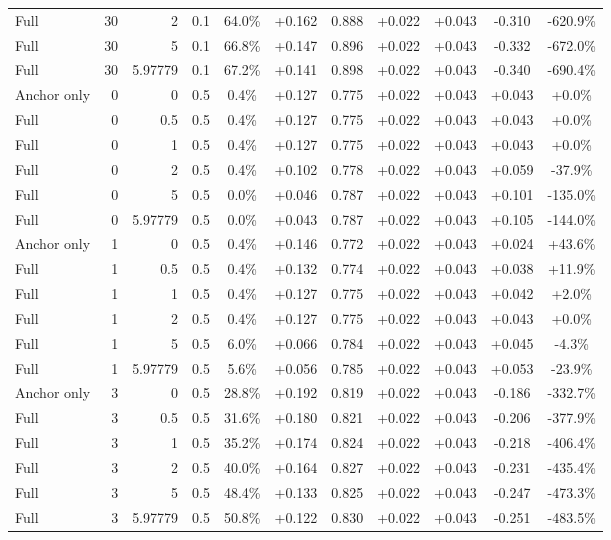 \begin{table}[htbp]
\begin{tabular}{lrrrccccccc}
Full & 30 & 2 & 0.1 & 64.0\% & +0.162 & 0.888 & +0.022 & +0.043 & -0.310 & -620.9\% \\
Full & 30 & 5 & 0.1 & 66.8\% & +0.147 & 0.896 & +0.022 & +0.043 & -0.332 & -672.0\% \\
Full & 30 & 5.97779 & 0.1 & 67.2\% & +0.141 & 0.898 & +0.022 & +0.043 & -0.340 & -690.4\% \\
Anchor only & 0 & 0 & 0.5 & 0.4\% & +0.127 & 0.775 & +0.022 & +0.043 & +0.043 & +0.0\% \\
Full & 0 & 0.5 & 0.5 & 0.4\% & +0.127 & 0.775 & +0.022 & +0.043 & +0.043 & +0.0\% \\
Full & 0 & 1 & 0.5 & 0.4\% & +0.127 & 0.775 & +0.022 & +0.043 & +0.043 & +0.0\% \\
Full & 0 & 2 & 0.5 & 0.4\% & +0.102 & 0.778 & +0.022 & +0.043 & +0.059 & -37.9\% \\
Full & 0 & 5 & 0.5 & 0.0\% & +0.046 & 0.787 & +0.022 & +0.043 & +0.101 & -135.0\% \\
Full & 0 & 5.97779 & 0.5 & 0.0\% & +0.043 & 0.787 & +0.022 & +0.043 & +0.105 & -144.0\% \\
Anchor only & 1 & 0 & 0.5 & 0.4\% & +0.146 & 0.772 & +0.022 & +0.043 & +0.024 & +43.6\% \\
Full & 1 & 0.5 & 0.5 & 0.4\% & +0.132 & 0.774 & +0.022 & +0.043 & +0.038 & +11.9\% \\
Full & 1 & 1 & 0.5 & 0.4\% & +0.127 & 0.775 & +0.022 & +0.043 & +0.042 & +2.0\% \\
Full & 1 & 2 & 0.5 & 0.4\% & +0.127 & 0.775 & +0.022 & +0.043 & +0.043 & +0.0\% \\
Full & 1 & 5 & 0.5 & 6.0\% & +0.066 & 0.784 & +0.022 & +0.043 & +0.045 & -4.3\% \\
Full & 1 & 5.97779 & 0.5 & 5.6\% & +0.056 & 0.785 & +0.022 & +0.043 & +0.053 & -23.9\% \\
Anchor only & 3 & 0 & 0.5 & 28.8\% & +0.192 & 0.819 & +0.022 & +0.043 & -0.186 & -332.7\% \\
Full & 3 & 0.5 & 0.5 & 31.6\% & +0.180 & 0.821 & +0.022 & +0.043 & -0.206 & -377.9\% \\
Full & 3 & 1 & 0.5 & 35.2\% & +0.174 & 0.824 & +0.022 & +0.043 & -0.218 & -406.4\% \\
Full & 3 & 2 & 0.5 & 40.0\% & +0.164 & 0.827 & +0.022 & +0.043 & -0.231 & -435.4\% \\
Full & 3 & 5 & 0.5 & 48.4\% & +0.133 & 0.825 & +0.022 & +0.043 & -0.247 & -473.3\% \\
Full & 3 & 5.97779 & 0.5 & 50.8\% & +0.122 & 0.830 & +0.022 & +0.043 & -0.251 & -483.5\% \\

\end{tabular}
\end{table}
